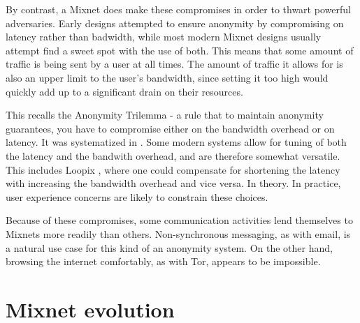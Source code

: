 \documentclass{article}
\begin{document}
 By contrast, a Mixnet does make these compromises in order to thwart powerful adversaries. Early designs attempted to ensure anonymity by compromising on latency rather than badwidth, while most modern Mixnet designs usually attempt find a sweet spot with the use of both. This means that some amount of traffic is being sent by a user at all times. The amount of traffic it allows for is also an upper limit to the user's bandwidth, since setting it too high would quickly add up to a significant drain on their resources. 

\pagebreak
 This recalls the Anonymity Trilemma - a rule that to maintain anonymity guarantees, you have to compromise either on the bandwidth overhead or on latency. It was systematized in . Some modern systems allow for tuning of both the latency and the bandwith overhead, and are therefore somewhat versatile. This includes Loopix , where one could compensate for shortening the latency with increasing the bandwidth overhead and vice versa. In theory. In practice, user experience concerns are likely to constrain these choices.

Because of these compromises, some communication activities lend themselves to Mixnets more readily than others. Non-synchronous messaging, as with email, is a natural use case for this kind of an anonymity system. On the other hand, browsing the internet comfortably, as with Tor, appears to be impossible.



\section{Mixnet evolution}



\end{document}
